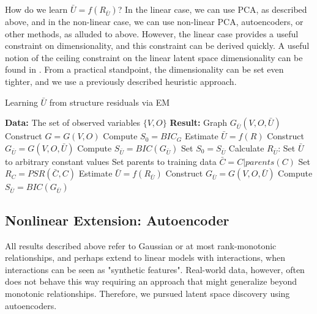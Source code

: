 \documentclass[letterpaper]{article}
\begin{document}
How do we learn $\bar{U} = f(R_{\bar{U}})$?  In the linear case, we can use PCA, as described above, and in the non-linear case, we can use non-linear PCA, autoencoders, or other methods, as alluded to above.  However, the linear case provides a useful constraint on dimensionality, and this constraint can be derived quickly.  A useful notion of the ceiling constraint on the linear latent space dimensionality can be found in \cite{gavish_optimal_2014}.  From a practical standpoint, the dimensionality can be set even tighter, and we use a previously described heuristic approach\cite{buja_remarks_1992}.


\begin{algorithm}%
 \caption{Learning $\bar{U}$ from structure residuals via EM}
 \label{alg:latentEM}
\begin{algorithmic}
 \State \textbf{Data:} The set of observed variables $\{V, O\}$
 \State \textbf{Result:} Graph $G_{\bar{U}}(V, O, \bar{U})$
 \State Construct $G = G(V, O)$\;
 \State Compute $S_0 = BIC_{G}$\;
 \State Estimate $\bar{U} = f(R)$\;
 \State Construct $G_{\bar{U}} = G(V, O, \bar{U})$\;
 \State Compute $S_{\bar{U}} = BIC(G_{\bar{U}})$\;
  \State Set $S_0 = S_{\bar{U}}$\;
  \State Calculate $R_{\bar{U}}$:\;
  \State Set $\bar{U}$ to arbitrary constant values\;
  	\State Set parents to training data\;
  	\State $\bar{C} = C|parents(C)$\;
  	\State Set $R_C = PSR(\bar{C}, C)$\;
  \EndFor
  \State Estimate $\bar{U} = f(R_{\bar{U}})$\;
  \State Construct $G_{\bar{U}} = G(V, O, \bar{U})$\;
  \State Compute $S_{\bar{U}} = BIC(G_{\bar{U}})$\;
 \EndWhile
\end{algorithmic}
\end{algorithm}



\subsection{Nonlinear Extension: Autoencoder}

All results described above refer to Gaussian or at most rank-monotonic relationships, and perhaps extend to linear models with interactions, when interactions can be seen as "synthetic features". Real-world data, however, often does not behave this way requiring an approach that might generalize beyond monotonic relationships.  Therefore, we pursued latent space discovery using autoencoders.
\end{document}
